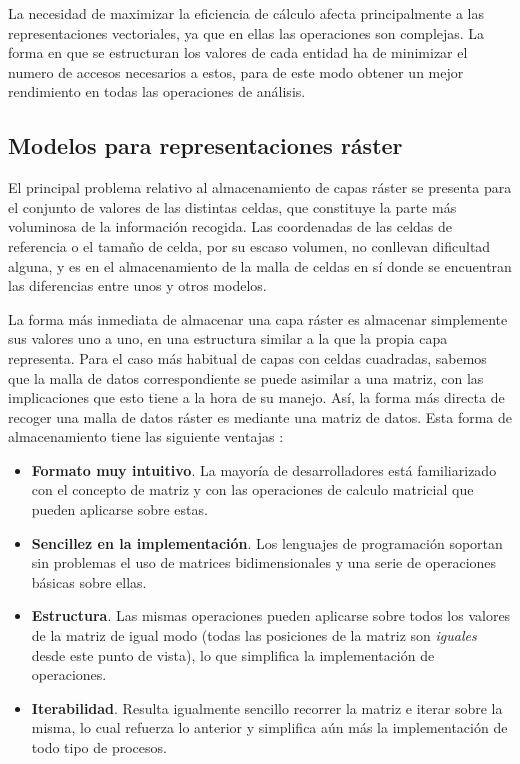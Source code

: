 \begin{multicols}{2}
La necesidad de maximizar la eficiencia de cálculo afecta principalmente a las representaciones vectoriales, ya que en ellas las operaciones son complejas. La forma en que se estructuran los valores de cada entidad ha de minimizar el numero de accesos necesarios a estos, para de este modo obtener un mejor rendimiento en todas las operaciones de análisis.

\subsection{Modelos para representaciones ráster}

El principal problema relativo al almacenamiento de capas ráster se presenta para el conjunto de valores de las distintas celdas, que constituye la parte más voluminosa de la información recogida. Las coordenadas de las celdas de referencia o el tamaño de celda, por su escaso volumen, no conllevan dificultad alguna, y es en el almacenamiento de la malla de celdas en sí donde se encuentran las diferencias entre unos y otros modelos.

La forma más inmediata de almacenar una capa ráster es almacenar simplemente sus valores uno a uno, en una estructura similar a la que la propia capa representa. Para el caso más habitual de capas con celdas cuadradas, sabemos que la malla de datos correspondiente se puede asimilar a una matriz, con las implicaciones que esto tiene a la hora de su manejo. Así, la forma más directa de recoger una malla de datos ráster es mediante una matriz de datos. Esta forma de almacenamiento tiene las siguiente ventajas \cite{Egenhofer1991Maguire}:


\begin{itemize}
 \item \textbf{Formato muy intuitivo}. La mayoría de desarrolladores está familiarizado con el concepto de matriz y con las operaciones de calculo matricial que pueden aplicarse sobre estas.
\item \textbf{Sencillez en la implementación}. Los lenguajes de programación soportan sin problemas el uso de matrices bidimensionales y una serie de operaciones básicas sobre ellas.
\item \textbf{Estructura}. Las mismas operaciones pueden aplicarse sobre todos los valores de la matriz de igual modo (todas las posiciones de la matriz son \emph{iguales} desde este punto de vista), lo que simplifica la implementación de operaciones.
\item \textbf{Iterabilidad}. Resulta igualmente sencillo recorrer la matriz e iterar sobre la misma, lo cual refuerza lo anterior y simplifica aún más la implementación de todo tipo de procesos.
\end{itemize}


\end{multicols}
